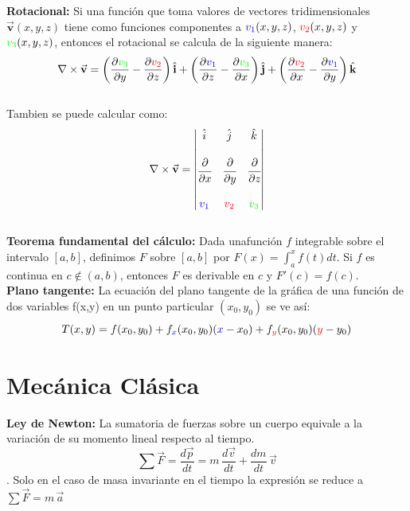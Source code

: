 \documentclass[12pt,a4paper]{article}
\begin{document}
 \textbf{Rotacional:} Si una función que toma valores de vectores tridimensionales  $\vec{\textbf{v}}(x,y,z)$ tiene como funciones componentes a $\textcolor{blue}{v_1}(x,y,z)$, $\textcolor{red}{v_2}(x,y,z)$ y $\textcolor{green}{v_3}(x,y,z)$, entonces el rotacional se calcula de la siguiente manera:
$$\nabla \times \vec{\textbf{v}}  = \left( \dfrac{\partial \textcolor{green}{v_3}}{\partial y}- \dfrac{\partial \textcolor{red}{v_2}}{\partial z} \right)\hat{\textbf{i}} + \left( \dfrac{\partial \textcolor{blue}{v_1}}{\partial z}-  \dfrac{\partial \textcolor{green}{v_3}}{\partial x} \right)\hat{\textbf{j}} + \left( \dfrac{\partial \textcolor{red}{v_2}}{\partial x}- \dfrac{\partial \textcolor{blue}{v_1}}{\partial y} \right)\hat{\textbf{k}} $$
\\
Tambien se puede calcular como:
$$\nabla\times \vec{\textbf{v}}=\left|
\begin{matrix} \hat i & \hat j & \hat k  \\ & & \\
\cfrac{\partial}{\partial x} & \cfrac{\partial}{\partial y} & \cfrac{\partial}{\partial z}
\\ & & \\ \textcolor{blue}{v_1} & \textcolor{red}{v_2} & \textcolor{green}{v_3}  \end{matrix}\right|$$
\\


\textbf{Teorema fundamental del cálculo:} Dada unafunción $f$ integrable sobre el intervalo $ [a,b]$, definimos $F$ sobre $[a,b]$ por $F(x) = {\int_{a}^x f(t)dt}$. Si $f$ es continua en $c \notin (a,b)$, entonces $F$ es derivable en $c$ y $F'(c) = f(c)$.\\

\textbf{Plano tangente:} La ecuación del plano tangente de la gráfica de una función de dos variables f(x,y) en un punto particular $(x_0, y_0)$ se ve así:
$$T(x, y) = f(x_0, y_0) + {f_{\textcolor{blue}{x}}(x_0, y_0)}(\textcolor{blue}{x}-x_0) + {f_{\textcolor{red}{y}}(x_0, y_0)}(\textcolor{red}{y}-y_0) $$



\section{Mecánica Clásica}
\textbf{Ley de Newton:} La sumatoria de fuerzas sobre un cuerpo equivale a la variación de su momento lineal respecto al tiempo.\\
$$\sum{\vec{F}} = \dfrac{d\vec{p}}{dt} = m \, \dfrac{d\vec{v}}{dt} + \dfrac{dm}{dt} \, \vec{v}$$.
Solo en el caso de masa invariante en el tiempo la expresión se reduce a $\sum {\vec{F}} = m \, \vec{a}$\\
\end{document}

